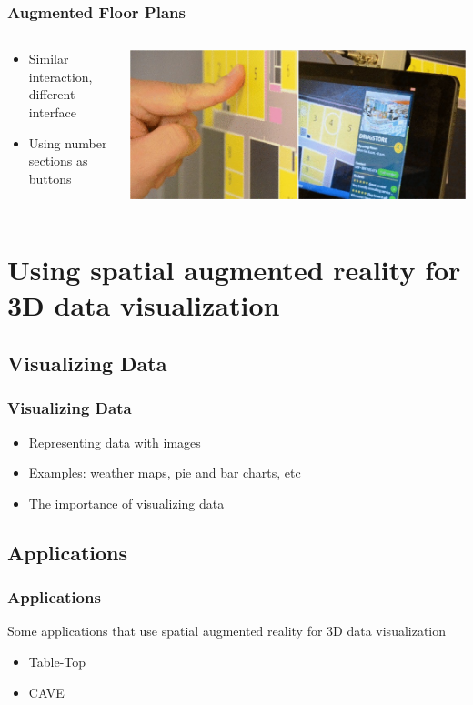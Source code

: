 \documentclass{beamer}
\begin{document}
\begin{frame}
	\frametitle{Augmented Floor Plans}
	\begin{columns}
	\begin{column}{0.45\textwidth}
	\begin{itemize}
		\item Similar interaction, different interface
		\item Using number sections as buttons
	\end{itemize}
	\end{column}
	\begin{column}{0.55\textwidth}
	\includegraphics[width=\textwidth]{images/AugmentedFloorPlans}
	\end{column}
	\end{columns}	
\end{frame}

\section[Using spatial augmented reality for 3D data visualization]{Using spatial augmented reality for 3D data visualization}

\subsection{Visualizing Data}
\begin{frame}	
\frametitle{Visualizing Data}
	\begin{itemize}
		\item Representing data with images
		\item Examples: weather maps, pie and bar charts, etc
		\item The importance of visualizing data
	\end{itemize}
\end{frame}

\subsection{Applications}
\begin{frame}
\frametitle{Applications}
	Some applications that use spatial augmented reality for 3D data visualization   
	\begin{itemize}
		\item Table-Top
		\item CAVE
	\end{itemize}
\end{frame}
\end{document}
